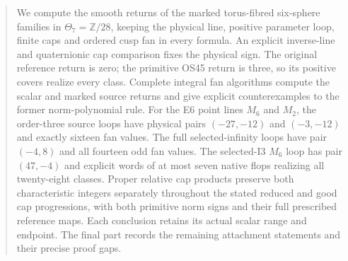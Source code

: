 \begin{abstract}
We compute the smooth returns of the marked torus-fibred six-sphere
families in $\Theta_7=\mathbb Z/28$, keeping the physical line,
positive parameter loop, finite caps and ordered cusp fan in every
formula. An explicit inverse-line and quaternionic cap comparison
fixes the physical sign. The original reference return is zero;
the primitive OS45 return is three, so its positive covers realize
every class. Complete integral fan algorithms compute the scalar
and marked source returns and give explicit counterexamples to the
former norm-polynomial rule.
For the E6 point lines $M_6$ and $M_2$, the order-three source
loops have physical pairs $(-27,-12)$ and $(-3,-12)$ and exactly
sixteen fan values. The full selected-infinity loops have pair
$(-4,8)$ and all fourteen odd fan values. The selected-I3 $M_6$
loop has pair $(47,-4)$ and explicit words of at most seven native
flops realizing all twenty-eight classes. Proper relative cap
products preserve both characteristic integers separately throughout
the stated reduced and good cap progressions, with both primitive
norm signs and their full prescribed reference maps. Each conclusion
retains its actual scalar range and endpoint. The final part records
the remaining attachment statements and their precise proof gaps.
\end{abstract}
